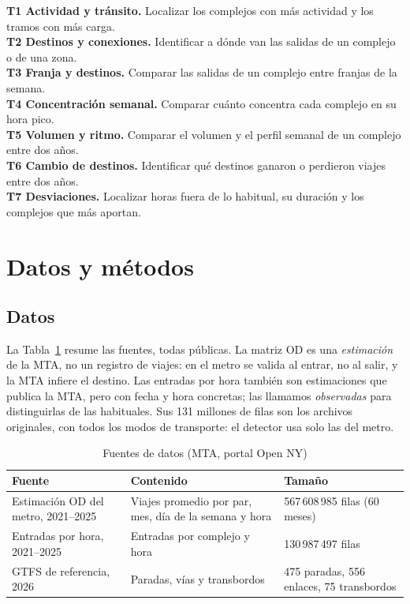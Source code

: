 \documentclass[conference,a4paper]{IEEEtran}
\begin{document}
\noindent\textbf{T1 Actividad y tránsito.} Localizar los complejos con más actividad y los tramos con más carga.\\
\textbf{T2 Destinos y conexiones.} Identificar a dónde van las salidas de un complejo o de una zona.\\
\textbf{T3 Franja y destinos.} Comparar las salidas de un complejo entre franjas de la semana.\\
\textbf{T4 Concentración semanal.} Comparar cuánto concentra cada complejo en su hora pico.\\
\textbf{T5 Volumen y ritmo.} Comparar el volumen y el perfil semanal de un complejo entre dos años.\\
\textbf{T6 Cambio de destinos.} Identificar qué destinos ganaron o perdieron viajes entre dos años.\\
\textbf{T7 Desviaciones.} Localizar horas fuera de lo habitual, su duración y los complejos que más aportan.

\section{Datos y métodos}
\subsection{Datos}
La Tabla~\ref{tab:datos} resume las fuentes, todas públicas. La matriz OD es una \emph{estimación} de la MTA, no un registro de viajes: en el metro se valida al entrar, no al salir, y la MTA infiere el destino. Las entradas por hora también son estimaciones que publica la MTA, pero con fecha y hora concretas; las llamamos \emph{observadas} para distinguirlas de las habituales. Sus 131 millones de filas son los archivos originales, con todos los modos de transporte: el detector usa solo las del metro.

\begin{table}[t]
\caption{Fuentes de datos (MTA, portal Open NY)}
\label{tab:datos}
\centering\footnotesize
\begin{tabular}{@{}p{}p{}p{}@{}}
\toprule
Fuente & Contenido & Tamaño\\
\midrule
Estimación OD del metro, 2021--2025~\cite{data} & Viajes promedio por par, mes, día de la semana y hora & 567\,608\,985 filas (60 meses)\\
Entradas por hora, 2021--2025~\cite{data} & Entradas por complejo y hora & 130\,987\,497 filas\\
GTFS de referencia, 2026 & Paradas, vías y transbordos & 475 paradas, 556 enlaces, 75 transbordos\\
\bottomrule
\end{tabular}
\end{table}
\end{document}
